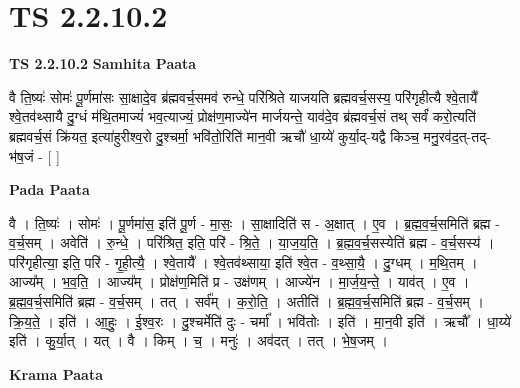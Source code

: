 \documentclass[17pt]{extarticle}
\begin{document}
\section*{ TS 2.2.10.2 }

\textbf{TS 2.2.10.2 } \newline
\textbf{Samhita Paata} \newline

वै ति॒ष्यः॑ सोमः॑ पू॒र्णमा॑सः सा॒क्षादे॒व ब्र॑ह्मवर्च॒समव॑ रुन्धे॒ परि॑श्रिते याजयति ब्रह्मवर्च॒सस्य॒ परि॑गृहीत्यै श्वे॒तायै᳚ श्वे॒तव॑थ्सायै दु॒ग्धं म॑थि॒तमाज्यं॑ भव॒त्याज्यं॒ प्रोक्ष॑ण॒माज्ये॑न मार्जयन्ते॒ याव॑दे॒व ब्र॑ह्मवर्च॒सं तथ् सर्वं॑ करो॒त्यति॑ ब्रह्मवर्च॒सं क्रि॑यत॒ इत्या॑हुरीश्व॒रो दु॒श्चर्मा॒ भवि॑तो॒रिति॑ मान॒वी ऋचौ॑ धा॒य्ये॑ कुर्या॒द्-यद्वै किञ्च॒ मनु॒रव॑द॒त्-तद्-भ॑ष॒जं - [  ] \newline

\textbf{Pada Paata} \newline

वै । ति॒ष्यः॑ । सोमः॑ । पू॒र्णमा॑स॒ इति॑ पू॒र्ण - मा॒सः॒ । सा॒क्षादिति॑ स - अ॒क्षात् । ए॒व । ब्र॒ह्म॒व॒र्च॒समिति॑ ब्रह्म - व॒र्च॒सम् । अवेति॑ । रु॒न्धे॒ । परि॑श्रित॒ इति॒ परि॑ - श्रि॒ते॒ । या॒ज॒य॒ति॒ । ब्र॒ह्म॒व॒र्च॒सस्येति॑ ब्रह्म - व॒र्च॒सस्य॑ । परि॑गृहीत्या॒ इति॒ परि॑ - गृ॒ही॒त्यै॒ । श्वे॒तायै᳚ । श्वे॒तव॑थ्साया॒ इति॑ श्वे॒त - व॒थ्सा॒यै॒ । दु॒ग्धम् । म॒थि॒तम् । आज्य᳚म् । भ॒व॒ति॒ । आज्य᳚म् । प्रोक्ष॑ण॒मिति॑ प्र - उक्ष॑णम् । आज्ये॑न । मा॒र्ज॒य॒न्ते॒ । याव॑त् । ए॒व । ब्र॒ह्म॒व॒र्च॒समिति॑ ब्रह्म - व॒र्च॒सम् । तत् । सर्व᳚म् । क॒रो॒ति॒ । अतीति॑ । ब्र॒ह्म॒व॒र्च॒समिति॑ ब्रह्म - व॒र्च॒सम् । क्रि॒य॒ते॒ । इति॑ । आ॒हुः॒ । ई॒श्व॒रः । दु॒श्चर्मेति॑ दुः - चर्मा᳚ । भवि॑तोः । इति॑ । मा॒न॒वी इति॑ । ऋचौ᳚ । धा॒य्ये॑ इति॑ । कु॒र्या॒त् । यत् । वै । किम् । च॒ । मनुः॑ । अव॑दत् । तत् । भे॒ष॒जम् ।  \newline


\textbf{Krama Paata} \newline
\end{document}
